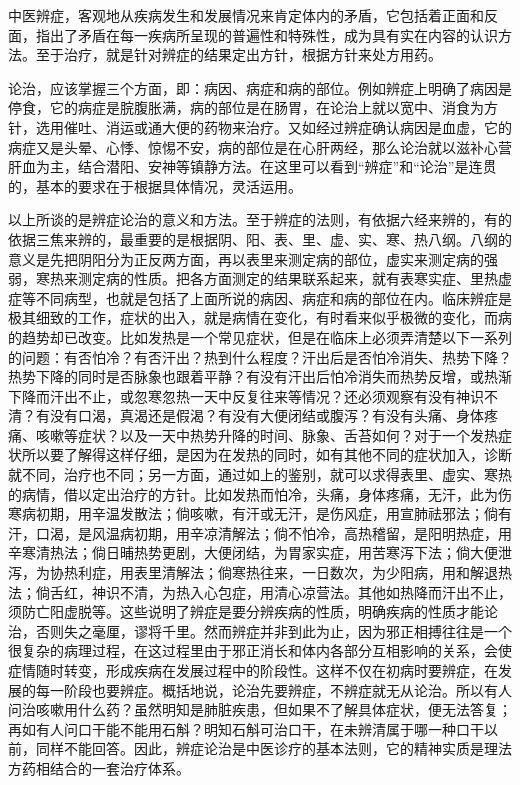 \documentclass[12pt,UTF8]{ctexbook}
\begin{document}
中医辨症，客观地从疾病发生和发展情况来肯定体内的矛盾，它包括着正面和反面，指出了矛盾在每一疾病所呈现的普遍性和特殊性，成为具有实在内容的认识方法。至于治疗，就是针对辨症的结果定出方针，根据方针来处方用药。

论治，应该掌握三个方面，即：病因、病症和病的部位。例如辨症上明确了病因是停食，它的病症是脘腹胀满，病的部位是在肠胃，在论治上就以宽中、消食为方针，选用催吐、消运或通大便的药物来治疗。又如经过辨症确认病因是血虚，它的病症又是头晕、心悸、惊惕不安，病的部位是在心肝两经，那么论治就以滋补心营肝血为主，结合潜阳、安神等镇静方法。在这里可以看到“辨症”和“论治”是连贯的，基本的要求在于根据具体情况，灵活运用。

以上所谈的是辨症论治的意义和方法。至于辨症的法则，有依据六经来辨的，有的依据三焦来辨的，最重要的是根据阴、阳、表、里、虚、实、寒、热八纲。八纲的意义是先把阴阳分为正反两方面，再以表里来测定病的部位，虚实来测定病的强弱，寒热来测定病的性质。把各方面测定的结果联系起来，就有表寒实症、里热虚症等不同病型，也就是包括了上面所说的病因、病症和病的部位在内。临床辨症是极其细致的工作，症状的出入，就是病情在变化，有时看来似乎极微的变化，而病的趋势却已改变。比如发热是一个常见症状，但是在临床上必须弄清楚以下一系列的问题：有否怕冷？有否汗出？热到什么程度？汗出后是否怕冷消失、热势下降？热势下降的同时是否脉象也跟着平静？有没有汗出后怕冷消失而热势反增，或热渐下降而汗出不止，或忽寒忽热一天中反复往来等情况？还必须观察有没有神识不清？有没有口渴，真渴还是假渴？有没有大便闭结或腹泻？有没有头痛、身体疼痛、咳嗽等症状？以及一天中热势升降的时间、脉象、舌苔如何？对于一个发热症状所以要了解得这样仔细，是因为在发热的同时，如有其他不同的症状加入，诊断就不同，治疗也不同；另一方面，通过如上的鉴别，就可以求得表里、虚实、寒热的病情，借以定出治疗的方针。比如发热而怕冷，头痛，身体疼痛，无汗，此为伤寒病初期，用辛温发散法；倘咳嗽，有汗或无汗，是伤风症，用宣肺祛邪法；倘有汗，口渴，是风温病初期，用辛凉清解法；倘不怕冷，高热稽留，是阳明热症，用辛寒清热法；倘日晡热势更剧，大便闭结，为胃家实症，用苦寒泻下法；倘大便泄泻，为协热利症，用表里清解法；倘寒热往来，一日数次，为少阳病，用和解退热法；倘舌红，神识不清，为热入心包症，用清心凉营法。其他如热降而汗出不止，须防亡阳虚脱等。这些说明了辨症是要分辨疾病的性质，明确疾病的性质才能论治，否则失之毫厘，谬将千里。然而辨症并非到此为止，因为邪正相搏往往是一个很复杂的病理过程，在这过程里由于邪正消长和体内各部分互相影响的关系，会使症情随时转变，形成疾病在发展过程中的阶段性。这样不仅在初病时要辨症，在发展的每一阶段也要辨症。概括地说，论治先要辨症，不辨症就无从论治。所以有人问治咳嗽用什么药？虽然明知是肺脏疾患，但如果不了解具体症状，便无法答复；再如有人问口干能不能用石斛？明知石斛可治口干，在未辨清属于哪一种口干以前，同样不能回答。因此，辨症论治是中医诊疗的基本法则，它的精神实质是理法方药相结合的一套治疗体系。
\end{document}

